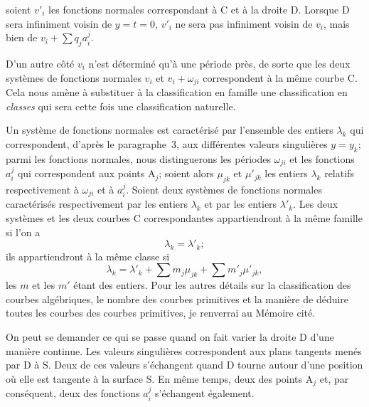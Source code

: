 \documentclass{article}
\begin{document}
soient $v'_{i}$ les fonctions normales correspondant à $\mathrm{C}$ et à la droite $\mathrm{D}$. Lorsque $\mathrm{D}$ sera infiniment voisin de $y = t = 0$, $v'_{i}$ ne sera pas infiniment voisin de $v_{i}$, mais bien de $\displaystyle v_{i} + \sum q_{j} a_{i}^{j}$.

D'un autre côté $v_{i}$ n'est déterminé qu'à une période près, de sorte que les deux systèmes de fonctions normales $v_{i}$ et $v_{i} + \omega_{ji}$ correspondent à la même courbe $\mathrm{C}$. Cela nous amène à substituer à la classification en famille une classification en \emph{classes} qui sera cette fois une classification naturelle.

Un système de fonctions normales est caractérisé par l'ensemble des entiers $\lambda_{k}$ qui correspondent, d'après le paragraphe~3, aux différentes valeurs singulières $y = y_{k}$; parmi les fonctions normales, nous distinguerons les périodes $\omega_{ji}$ et les fonctions $a_{i}^{j}$ qui correspondent aux points $\mathrm{A}_{j}$; soient alors $\mu_{jk}$ et $\mu'_{jk}$ les entiers $\lambda_{k}$ relatifs respectivement à $\omega_{ji}$ et à $a_{i}^{j}$. Soient deux systèmes de fonctions normales caractérisés respectivement par les entiers $\lambda_{k}$ et par les entiers $\lambda'_{k}$. Les deux systèmes et les deux courbes $\mathrm{C}$ correspondantes appartiendront à la même famille si l'on a
\[
\lambda_{k} = \lambda'_{k};
\]
ils appartiendront à la même classe si
\[
\lambda_{k} = \lambda'_{k} + \sum m_{j} \mu_{jk} + \sum m'_{j} \mu'_{jk},
\]
les $m$ et les $m'$ étant des entiers. Pour les autres détails sur la classification des courbes algébriques, le nombre des courbes primitives et la manière de déduire toutes les courbes des courbes primitives, je renverrai au Mémoire cité.

On peut se demander ce qui se passe quand on fait varier la droite $\mathrm{D}$ d'une manière continue. Les valeurs singulières correspondent aux plans tangents menés par $\mathrm{D}$ à $\mathrm{S}$. Deux de ces valeurs s'échangent quand $\mathrm{D}$ tourne autour d'une position où elle est tangente à la surface $\mathrm{S}$. En même temps, deux des points $\mathrm{A}_{j}$ et, par conséquent, deux des fonctions $a_{i}^{j}$ s'échangent également.
\end{document}
